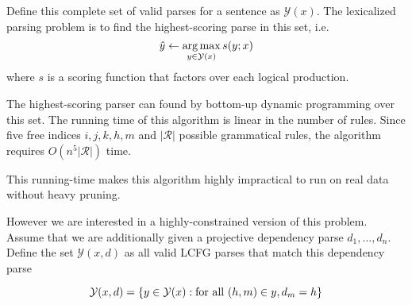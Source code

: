 \documentclass[11pt,letterpaper]{article}
\DeclareMathOperator*{\argmax}{arg\,max}
\newcommand{\rules}{\mathcal{R}}
\begin{document}

Define this complete set of valid parses for a sentence as  $\mathcal{Y}(x)$.
The lexicalized parsing problem is to find the highest-scoring parse in this set, i.e.  \[ \hat{y} \gets \argmax_{y \in {\cal Y}(x)} s(y;x) \] where
$s$ is a scoring function that factors over each logical production.


The highest-scoring parser can found by bottom-up dynamic programming
over this set. The running time of this algorithm is linear 
in the number of rules. Since five free indices $i, j, k, h, m$ and
$|\rules|$ possible grammatical rules, the algorithm
requires $O(n^5 |\rules|)$ time.

This running-time makes this algorithm highly impractical to run on
real data without heavy pruning. 

However we are interested in a
highly-constrained version of this problem. Assume that we are additionally given a projective dependency parse $d_1, \ldots, d_n$.
Define the set $\mathcal{Y}(x,d)$ as all valid LCFG parses that match
this dependency parse 

\[
  {\cal Y}(x,d )  = \{ y \in {\cal Y}(x): \mathrm{for\ all\ }(h,m) \in y,  d_m =  h   \}
\]













\end{document}
